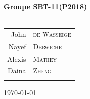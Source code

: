 \begin{titlepage}
\begin{center}
{\begin{center}
\begin{tabular}{rl}
\end{tabular}
\end{center}
\vfill
\begin{center}
  \textbf{Groupe SBT-11(P2018)} \\~\\
  
\begin{tabular}{rl}

    \quad John &\textsc{de Wasseige} \\
    \quad Nayef &\textsc{Derwiche} \\
    \quad Alexis &\textsc{Mathey} \\
    \quad Daina &\textsc{Zheng} \\ \\
\end{tabular}
\end{center}
}

\vfill

{\large \today}

\end{center}
\end{titlepage}